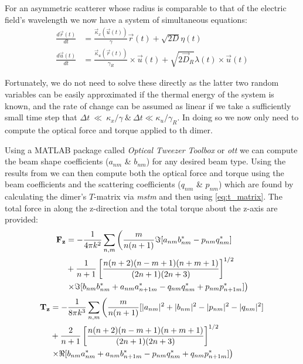 For an asymmetric scatterer whose radius is comparable to that of the 
electric field's wavelength we now have a system of simultaneous equations:
\begin{align}
	\label{eq:full_langevin}
  \frac{{d}\vec{r}(t)}{{dt}}
  &=
    \frac{\vec{\kappa}_x(\vec{u}(t))}{\gamma}\vec{r}(t) + \sqrt{2D}\eta(t)
  \\
  \frac{{d}\vec{u}(t)}{{dt}}
  &=
    \frac{\vec{\kappa}_u(\vec{r}(t))}{\gamma_R}\times \vec{u}(t)
    + \sqrt{2\vec{D}_R}\lambda(t)\times \vec{u}(t)
\end{align}

Fortunately, we do not need to solve these directly as the latter two
random variables can be easily approximated if the thermal energy of
the system is known, and the rate of change can be assumed as linear if
we take a sufficiently small time step that $\Delta t~\ll~\kappa_x/\gamma 
\ \& \ \Delta t \ll \kappa_u/\gamma_R$. In doing so we now only need 
to compute the optical force and torque applied to th dimer. 

Using a  MATLAB package called \textit{Optical Tweezer Toolbox} 
or \textit{ott} \cite{Nieminen2007} we can compute the beam 
shape coefficients ($a_{nm}$ \& $b_{nm}$) for any desired beam 
type. Using the results from \cite{Farsund1996} we can then 
compute both the optical force and torque using the beam 
coefficients and the scattering coefficients ($q_{nm}$ \& $p_{nm}$) 
which are found by calculating the dimer's $T$-matrix via \textit{mstm} 
\cite{Mackowski2011} and then using \eqref{eq:t_matrix}. The 
total force in along the z-direction and the total torque about 
the z-axis are provided:
\begin{equation}
	\label{eq:optical_force}
\begin{split}
  \bold{F_z}
  &=
    -\frac{1}{4\pi k^2}\sum_{n,m} \left(\frac{m}{n(n+1)}\Im[a_{nm}b^*_{nm}-p_{nm}q^*_{nm}] \right.
  \\ 
  &+\frac{1}{n+1}\left[\frac{n(n+2)(n-m+1)(n+m+1)}{(2n+1)(2n+3)} \right]^{1/2}
  \\
  & \left.\times\Im[b_{nm}b^*_{nm}+a_{nm}a^*_{n+1m}-q_{nm}q^*_{nm}+p_{nm}p^*_{n+1m}] \right)
\end{split}
\end{equation}
\begin{equation}
\begin{split}
  \bold{T_z}
  &=
    -\frac{1}{8\pi k^3}\sum_{n,m} \left(\frac{m}{n(n+1)}[|a_{nm}|^2+|b_{nm}|^2-|p_{nm}|^2-|q_{nm}|^2] \right.
  \\ 
  &+\frac{2}{n+1}\left[\frac{n(n+2)(n-m+1)(n+m+1)}{(2n+1)(2n+3)} \right]^{1/2}
  \\
  & \left.\times\Re[b_{nm}a^*_{nm}+a_{nm}b^*_{n+1m}-p_{nm}q^*_{nm}+q_{nm}p^*_{n+1m}] \right)
\end{split}
\end{equation}

